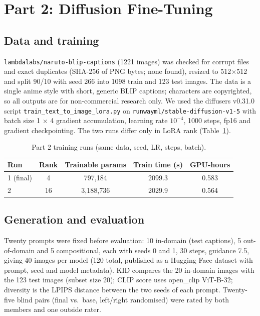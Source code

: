 \documentclass[10pt,twocolumn,letterpaper]{article}
\begin{document}
\section{Part 2: Diffusion Fine-Tuning}
\subsection{Data and training}
\texttt{lambdalabs/naruto-blip-captions} (1221 images) was checked for corrupt files and exact duplicates (SHA-256 of PNG
bytes; none found), resized to 512$\times$512 and split 90/10 with seed 266 into 1098 train and 123 test images. The data
is a single anime style with short, generic BLIP captions; characters are copyrighted, so all outputs are for
non-commercial research only. We used the diffusers v0.31.0 script \texttt{train\_text\_to\_image\_lora.py} on
\texttt{runwayml/stable-diffusion-v1-5} with batch size 1 $\times$ 4 gradient accumulation, learning rate $10^{-4}$, 1000
steps, fp16 and gradient checkpointing. The two runs differ only in LoRA rank (Table~\ref{tab:p2runs}).

\begin{table}[t]\centering\footnotesize
\caption{Part 2 training runs (same data, seed, LR, steps, batch).}\label{tab:p2runs}
\begin{tabular}{@{}lcccc@{}}\toprule
Run & Rank & Trainable params & Train time (s) & GPU-hours\\\midrule
1 (final) & 4 & 797{,}184 & 2099.3 & 0.583\\
2 & 16 & 3{,}188{,}736 & 2029.9 & 0.564\\\bottomrule
\end{tabular}
\end{table}

\subsection{Generation and evaluation}
Twenty prompts were fixed before evaluation: 10 in-domain (test captions), 5 out-of-domain and 5 compositional, each with
seeds 0 and 1, 30 steps, guidance 7.5, giving 40 images per model (120 total, published as a Hugging Face dataset with
prompt, seed and model metadata). KID compares the 20 in-domain images with the 123 test images (subset size 20); CLIP
score uses open\_clip ViT-B-32; diversity is the LPIPS distance between the two seeds of each prompt. Twenty-five blind
pairs (final vs.\ base, left/right randomised) were rated by both members and one outside rater.
\end{document}
